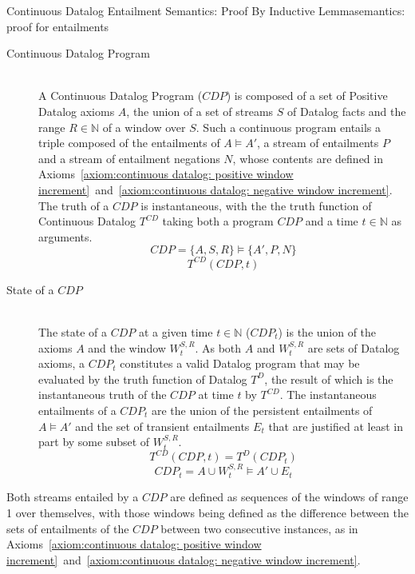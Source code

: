 \begin{nestedsection}{Continuous Datalog Entailment Semantics: Proof By Inductive Lemma}{semantics: proof for entailments}
	\begin{description}
		\item[Continuous Datalog Program]\label{def:continuous datalog: CDP}\hfill\\
			A Continuous Datalog Program (${CDP}$) is composed of a set of Positive Datalog axioms $A$, the union of a set of streams $S$ of Datalog facts and the range ${R \in \mathbb{N}}$ of a window over $S$.
			Such a continuous program entails a triple composed of the entailments of ${A \vDash A'}$, a stream of entailments $P$ and a stream of entailment negations $N$, whose contents are defined in Axioms~\ref{axiom:continuous datalog: positive window increment}~and~\ref{axiom:continuous datalog: negative window increment}.
			The truth of a ${CDP}$ is instantaneous, with the the truth function of Continuous Datalog $T^{CD}$ taking both a program ${CDP}$ and a time ${t \in \mathbb{N}}$ as arguments.
			\begin{equation*}
				CDP = \{A,S,R\} \vDash \{A',P,N\}
			\end{equation*}
			\begin{equation*}
				T^{CD} \left( CDP, t \right)
			\end{equation*}
		\item[State of a ${CDP}$]\label{def:continuous datalog: CDPt}\hfill\\
			The state of a ${CDP}$ at a given time ${t \in \mathbb{N}}$ (${CDP_t}$) is the union of the axioms $A$ and the window $W^{S,R}_{t}$.
			As both $A$ and $W^{S,R}_{t}$ are sets of Datalog axioms, a ${CDP_t}$ constitutes a valid Datalog program that may be evaluated by the truth function of Datalog $T^{D}$, the result of which is the instantaneous truth of the ${CDP}$ at time $t$ by $T^{CD}$.
			The instantaneous entailments of a $CDP_{t}$ are the union of the persistent entailments of ${A \vDash A'}$ and the set of transient entailments $E_{t}$ that are justified at least in part by some subset of $W^{S,R}_{t}$.
			\begin{equation*}
				T^{CD} \left( CDP, t \right) = T^{D} \left( CDP_t \right)
			\end{equation*}
			\begin{equation*}
				CDP_t = A \cup W^{S,R}_t \vDash A' \cup E_t
			\end{equation*}
	\end{description}
	Both streams entailed by a ${CDP}$ are defined as sequences of the windows of range 1 over themselves, with those windows being defined as the difference between the sets of entailments of the ${CDP}$ between two consecutive instances, as in Axioms~\ref{axiom:continuous datalog: positive window increment}~and~\ref{axiom:continuous datalog: negative window increment}.

\end{nestedsection}
